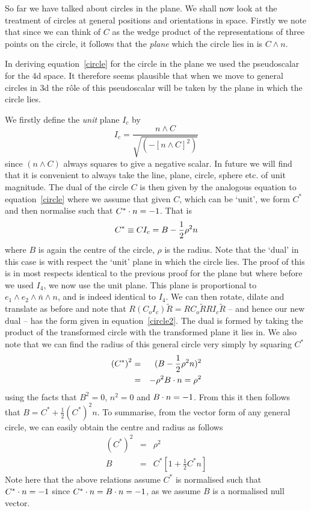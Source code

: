 So far we have talked about circles in the plane. We shall
now look at the treatment of circles at general positions and orientations
in space. Firstly we note that since we can think of $C$
as the wedge product of the representations of three
points on the circle, it follows that the \emph{plane}
which the circle lies in is $C \wedge n$.

In deriving equation~\ref{circle} for the circle in the plane we
used the pseudoscalar for the 4d space. It therefore seems plausible that
when we move to general circles in 3d the r\^ole of this
pseudoscalar will be taken by the plane in which the circle lies.

We firstly define the \emph{unit} plane $I_c$ by
%
\begin{equation}
  I_c = \frac{n\wedge C}{\sqrt{(-[n\wedge C]^2)}}
\end{equation}
%
since $(n\wedge C)$ always squares to give a negative
scalar. In future we will find
that it is convenient to always take the line, plane, circle,
sphere etc. of unit magnitude.
The dual of the circle $C$ is then given by the
analogous equation to equation~\ref{circle} where we
assume that given $C$, which can be `unit', we form $C^*$
and then normalise such that $C^*\cdot n= -1$. That is
%
\begin{equation}
   C^* \equiv C I_c= B - \frac{1}{2}\rho^2 n
   \label{circle2}
   \end{equation}
%
where $B$ is again the centre of the circle, $\rho$ is the radius.
Note that the `dual' in this case is with respect the `unit' plane
in which the circle lies. The proof of this is in most respects
identical to the previous proof for the plane but where before we
used $I_4$, we now use the unit plane. This plane is proportional to
$e_1\wedge e_2\wedge \bar{n}\wedge n$, and is indeed identical to $I_4$.
We can then rotate, dilate and translate as before and note that
$R(C_o I_c)\tilde{R}=RC_o\tilde{R}RI_c\tilde{R}$ -- and hence our new
dual -- has the form given in equation~\ref{circle2}. The dual is formed by
taking the product of the transformed circle with the transformed
plane it lies in.  We also note that we can find the radius of
this general circle very simply by squaring $C^*$
%
\begin{eqnarray}
\left(C^*\right)^2 &  = &  (B - \frac{1}{2}\rho^2n)^2 \nonumber \\
                  & = &  -\rho^2B\cdot n = \rho^2
\end{eqnarray}
%
using the facts that $B^2=0$, $n^2=0$ and $B\cdot n = -1$. From this
it then follows that $B = C^* + \frac{1}{2}(C^*)^2n$. To
summarise, from the vector form of any general circle, we can
easily obtain the centre and radius as follows
%
\begin{eqnarray}
    \left(C^*\right)^2 &  = &      \rho^2 \\
    B & = &  C^* \left[ 1 + \frac{1}{2}C^*n \right]
 \end{eqnarray}
Note here that the above relations assume $C^*$  is normalised
such that $C^*\cdot n=-1$ since $C^*\cdot n = B\cdot n = -1$, as we
assume $B$ is a normalised null vector.

